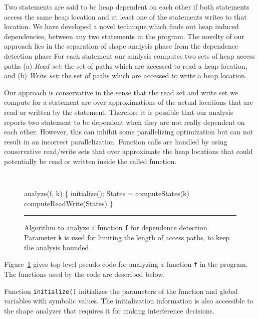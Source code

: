 \documentclass{IOS-Book-Article}
\begin{document}
Two statements are said to be heap dependent on each other if
both statements access the same heap location and at least
one of the statements writes to that location. We have
developed a novel technique which finds out heap induced
dependencies, between any two statements in the program. The
novelty of our approach lies in the separation of shape
analysis phase from the dependence detection phase For each
statement our analysis computes two sets of heap access paths
(a) {\em Read set}: the set of paths which are accessed to
read a heap location, and (b) {\em Write set}: the set of
paths which are accessed to write a heap location.

Our approach is conservative in the sense that the read set
and write set we compute for a statement are over
approximations of the actual locations that are read or
written by the statement. Therefore it is possible that our
analysis reports two statement to be dependent when they are
not really dependent on each other. However, this can inhibit
some parallelizing optimization but can not result in an
incorrect parallelization. Function calls are handled by
using conservative read/write sets that over approximate the
heap locations that could potentially be read or written
inside the called function.
\begin{figure}
{\tt
  \begin{program}{0}
  \FL analyze(f, k)  \{
   initialize(); 
   States = computeStates(k)
   computeReadWrite(States)
   \}
  \end{program}
}
  \caption{Algorithm to analyze a function {\tt f} for
    dependence detection. Parameter {\tt k} is used for
    limiting the length of access paths, to keep the analysis
    bounded. \label{fig:algoTopLevel}}
\hrule  
\end{figure}

Figure~\ref{fig:algoTopLevel} gives top level pseudo code for
analyzing a function {\tt f} in the program. The functions used by
the code are described below.

Function {\tt initialize()} initializes the
  parameters of the function and global variables with
  symbolic values. The initialization information is also
  accessible to the shape analyzer that requires it for
  making interference decisions.
  
\end{document}
